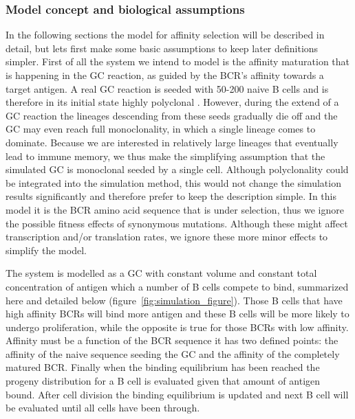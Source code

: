 \subsubsection{Model concept and biological assumptions}
In the following sections the model for affinity selection will be described in detail, but lets first make some basic assumptions to keep later definitions simpler.
First of all the system we intend to model is the affinity maturation that is happening in the GC reaction, as guided by the BCR's affinity towards a target antigen.
A real GC reaction is seeded with 50-200 naive B cells and is therefore in its initial state highly polyclonal \cite{tas2016visualizing}.
However, during the extend of a GC reaction the lineages descending from these seeds gradually die off \cite{tas2016visualizing} and the GC may even reach full monoclonality, in which a single lineage comes to dominate.
Because we are interested in relatively large lineages that eventually lead to immune memory, we thus make the simplifying assumption that the simulated GC is monoclonal seeded by a single cell.
Although polyclonality could be integrated into the simulation method, this would not change the simulation results significantly and therefore prefer to keep the description simple.
In this model it is the BCR amino acid sequence that is under selection, thus we ignore the possible fitness effects of synonymous mutations.
Although these might affect transcription and/or translation rates, we ignore these more minor effects to simplify the model.

The system is modelled as a GC with constant volume and constant total concentration of antigen which a number of B cells compete to bind, summarized here and detailed below (figure~\ref{fig:simulation_figure}).
Those B cells that have high affinity BCRs will bind more antigen and these B cells will be more likely to undergo proliferation, while the opposite is true for those BCRs with low affinity.
Affinity must be a function of the BCR sequence it has two defined points: the affinity of the naive sequence seeding the GC and the affinity of the completely matured BCR.
Finally when the binding equilibrium has been reached the progeny distribution for a B cell is evaluated given that amount of antigen bound.
After cell division the binding equilibrium is updated and next B cell will be evaluated until all cells have been through.


